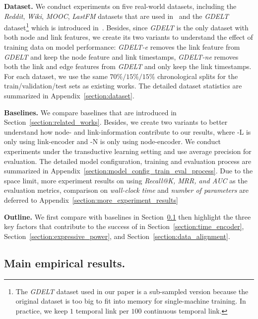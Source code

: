 
\noindent\textbf{Dataset.}
We conduct experiments on five real-world datasets, including the \textit{Reddit}, \textit{Wiki}, \textit{MOOC}, \textit{LastFM} datasets that are used in~\cite{kumar2019predicting} and the \textit{GDELT} dataset\footnote{The \textit{GDELT} dataset used in our paper is a sub-sampled version because the original dataset is too big to fit into memory for single-machine training. In practice, we keep $1$ temporal link per $100$ continuous temporal link.} which is introduced in~\cite{zhou2022tgl}.
Besides, since \textit{GDELT} is the only dataset with both node and link features, we create its two variants to understand the effect of training data on model performance: \textit{GDELT-e} removes the link feature from \textit{GDELT} and keep the node feature and link timestamps, \textit{GDELT-ne} removes both the link and edge features from \textit{GDELT} and only keep the link timestamps.
For each dataset, we use the same $70\%/15\%/15\%$ chronological splits for the train/validation/test sets as existing works.
The detailed dataset statistics are summarized in Appendix~\ref{section:dataset}. 

\noindent\textbf{Baselines.}
We compare baselines that are introduced in Section~\ref{section:related_works}. 
Besides, we create two variants to better understand how node- and link-information contribute to our results, where \oure-L is only using link-encoder and \oure-N is only using node-encoder.
We conduct experiments under the transductive learning setting and use average precision for evaluation.
The detailed model configuration, training and evaluation process are summarized in Appendix~\ref{section:model_config_train_eval_process}.
Due to the space limit, more experiment results on using \emph{Recall@K, MRR, and AUC} as the evaluation metrics, comparison on \emph{wall-clock time} and \emph{number of parameters} are deferred to Appendix~\ref{section:more_experiment_results}

\noindent\textbf{Outline.} We first compare \our with baselines in Section~\ref{section:empirical_results} then highlight the three key factors that contribute to the success of \our in Section~\ref{section:time_encoder}, Section~\ref{section:expressive_power}, and Section~\ref{section:data_alignment}.



\subsection{Main empirical results.} \label{section:empirical_results}


